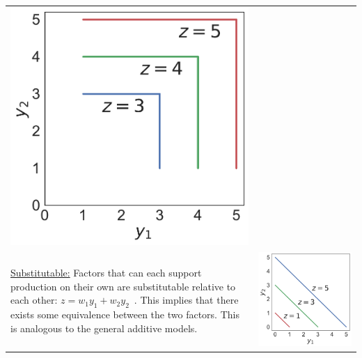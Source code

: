 \begin{table}[h!]
\begin{tabular}{m{}c}
\begin{minipage}{.17\textwidth}
      \includegraphics[width=\textwidth, height=.975\textwidth]{Figures/Antagonistic.pdf}
    \end{minipage}
    \\
    \vspace{-5pt}
    \uline{Substitutable:} Factors that can each support production on their own are substitutable relative to each other: $z = w_1y_1 + w_2y_2$~\cite{tilman1980}. This implies that there exists some equivalence between the two factors. This is analogous to the general additive models.
    &
    \begin{minipage}{.17\textwidth}
      \includegraphics[width=\textwidth, height=.975\textwidth]{Figures/Substitutable.pdf}

\end{minipage}
\end{tabular}
\end{table}
